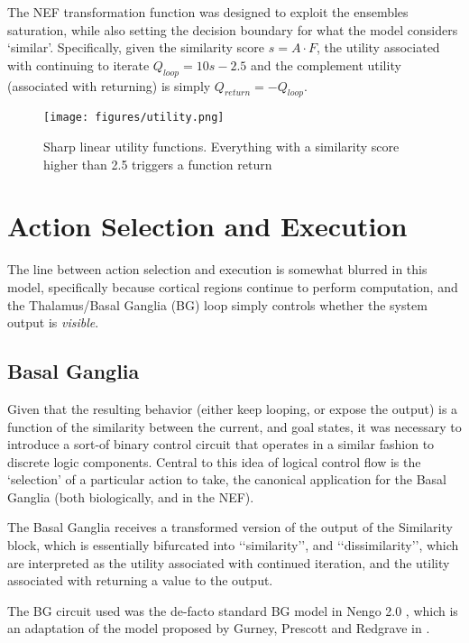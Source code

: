 \documentclass{report}
\begin{document}
The NEF transformation function was designed to exploit the ensembles saturation, while also setting the decision boundary for what the model considers \lq{}similar\rq{}.
Specifically, given the similarity score $s = A \cdot F$, the utility associated with continuing to iterate $Q_{loop} = 10s - 2.5$ and the complement utility (associated with returning) is simply $Q_{return} = - Q_{loop}$.

\begin{figure}[htd]
\centering
\texttt{[image: figures/utility.png]}
\caption{Sharp linear utility functions. Everything with a similarity score higher than 2.5 triggers a function return}
\label{fig:utility}
\end{figure}


\section{Action Selection and Execution}
The line between action selection and execution is somewhat blurred in this model, specifically because cortical regions continue to perform computation, and the Thalamus/Basal Ganglia (BG) loop simply controls whether the system output is \emph{visible}.

\subsection{Basal Ganglia}

Given that the resulting behavior (either keep looping, or expose the output) is a function of the similarity between the current, and goal states, it was necessary to introduce a sort-of binary control circuit that operates in a similar fashion to discrete logic components.
Central to this idea of logical control flow is the \lq{}selection\rq{} of a particular action to take, the canonical application for the Basal Ganglia (both biologically, and in the NEF).

The Basal Ganglia receives a transformed version of the output of the Similarity block, which is essentially bifurcated into \lq{}\lq{}similarity\rq{}\rq{}, and \lq{}\lq{}dissimilarity\rq{}\rq{}, which are interpreted as the utility associated with continued iteration, and the utility associated with returning a value to the output.

The BG circuit used was the de-facto standard BG model in Nengo 2.0 \cite{bekolay2014}, which is an adaptation of the model proposed by Gurney, Prescott and Redgrave in \cite{GurneyPrescottRedgrave01a}.
\end{document}
